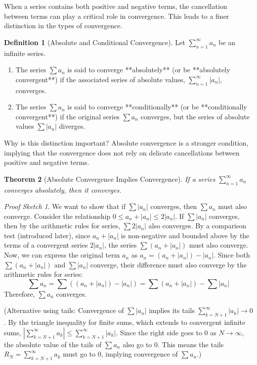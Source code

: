 \documentclass[11pt, letterpaper]{article}
\theoremstyle{plain} %
\newtheorem{theorem}{Theorem}[section] %
\theoremstyle{definition} %
\newtheorem{definition}[theorem]{Definition} %
\theoremstyle{remark} %
\newtheorem*{proofsketch}{Proof Sketch} %
\newcommand{\abs}[1]{\left|#1\right|} %
\begin{document}
When a series contains both positive and negative terms, the cancellation between terms can play a critical role in convergence. This leads to a finer distinction in the types of convergence.

\begin{definition}[Absolute and Conditional Convergence]
Let $\sum_{n=1}^{\infty} a_n$ be an infinite series.
\begin{enumerate}
    \item The series $\sum a_n$ is said to converge **absolutely** (or be **absolutely convergent**) if the associated series of absolute values, $\sum_{n=1}^{\infty} \abs{a_n}$, converges.
    \item The series $\sum a_n$ is said to converge **conditionally** (or be **conditionally convergent**) if the original series $\sum a_n$ converges, but the series of absolute values $\sum \abs{a_n}$ diverges.
\end{enumerate}
\end{definition}

Why is this distinction important? Absolute convergence is a stronger condition, implying that the convergence does not rely on delicate cancellations between positive and negative terms.

\begin{theorem}[Absolute Convergence Implies Convergence]
If a series $\sum_{n=1}^{\infty} a_n$ converges absolutely, then it converges.
\end{theorem}

\begin{proofsketch}
We want to show that if $\sum |a_n|$ converges, then $\sum a_n$ must also converge.
Consider the relationship $0 \le a_n + |a_n| \le 2|a_n|$.
If $\sum |a_n|$ converges, then by the arithmetic rules for series, $\sum 2|a_n|$ also converges.
By a comparison test (introduced later), since $a_n + |a_n|$ is non-negative and bounded above by the terms of a convergent series $2|a_n|$, the series $\sum (a_n + |a_n|)$ must also converge.
Now, we can express the original term $a_n$ as $a_n = (a_n + |a_n|) - |a_n|$.
Since both $\sum (a_n + |a_n|)$ and $\sum |a_n|$ converge, their difference must also converge by the arithmetic rules for series:
\[ \sum a_n = \sum \left( (a_n + |a_n|) - |a_n| \right) = \sum (a_n + |a_n|) - \sum |a_n| \]
Therefore, $\sum a_n$ converges.

(Alternative using tails: Convergence of $\sum |a_n|$ implies its tails $\sum_{k=N+1}^\infty |a_k| \to 0$. By the triangle inequality for finite sums, which extends to convergent infinite sums, $|\sum_{k=N+1}^\infty a_k| \le \sum_{k=N+1}^\infty |a_k|$. Since the right side goes to 0 as $N \to \infty$, the absolute value of the tails of $\sum a_n$ also go to 0. This means the tails $R_N = \sum_{k=N+1}^\infty a_k$ must go to 0, implying convergence of $\sum a_n$.)
\end{proofsketch}
\end{document}

